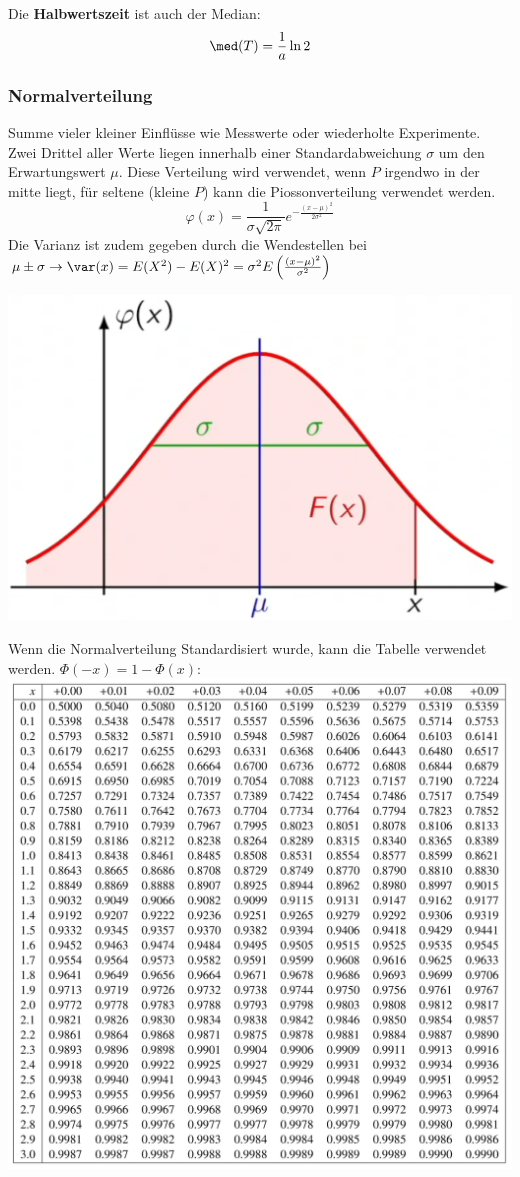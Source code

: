 \noindent Die \textbf{Halbwertszeit} ist auch der Median:
\[ \med(T) = \frac{1}{a}\ln2 \] 

\subsubsection{Normalverteilung}
Summe vieler kleiner Einflüsse wie Messwerte oder wiederholte Experimente. Zwei Drittel aller Werte liegen innerhalb einer Standardabweichung $\sigma$ um den Erwartungswert $\mu$. Diese Verteilung wird verwendet, wenn $P$ irgendwo in der mitte liegt, für seltene (kleine $P$) kann die Piossonverteilung verwendet werden.
\[
\varphi(x) = \frac{1}{\sigma\sqrt{2\pi}}e^{-\frac{(x-\mu)^2}{2\sigma^2}}
\]
\noindent Die Varianz ist zudem gegeben durch die Wendestellen bei $\mu \pm \sigma \rightarrow \var(x) = E(X^2) - E(X)^2 = \sigma^2E\left(\frac{(x - \mu)^2}{\sigma^2}\right)$

\begin{center}
	\includegraphics[width=0.4\columnwidth]{Images/normalverteilung}
\end{center}

\noindent Wenn die Normalverteilung Standardisiert wurde, kann die Tabelle verwendet werden. $\Phi(-x) = 1 - \Phi(x)$:\\
\includegraphics[width=\columnwidth]{Images/standard-normalverteilung}

